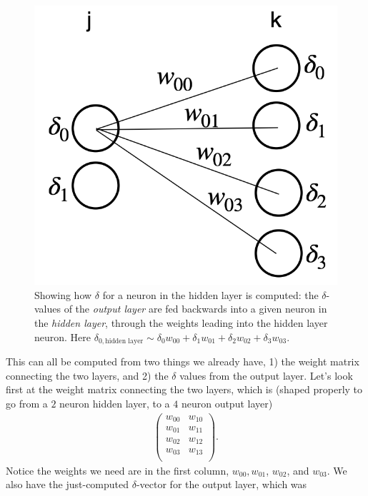 \documentclass[12pt]{article}
\begin{document}
 \begin{figure}[h]
\begin{center}
\includegraphics[scale=0.3]{Figs/nn_delta_connect}
\caption{Showing how $\delta$ for a neuron in the hidden layer is computed: the $\delta$-values of the \emph{output layer} are fed backwards into a given neuron in the \emph{hidden layer}, through the weights leading into the hidden layer neuron.  Here $\delta_{0,\textrm{hidden layer}}\sim \delta_0 w_{00} + \delta_1 w_{01} + \delta_2 w_{02}+ \delta_3 w_{03}.$}
\label{nn_delta_connect}
\end{center}
\end{figure}

This can all be computed from two things we already have, 1) the weight matrix connecting the two layers, and 2) the $\delta$ values from the output layer. Let's look first at the weight matrix connecting the two layers, which is (shaped properly to go from a $2$ neuron hidden layer, to a $4$ neuron output layer)
\begin{align}
 \begin{pmatrix}
           w_{00} &w_{10}  \\
           w_{01} &w_{11}  \\
  	  w_{02} &w_{12} \\
	   w_{03} &w_{13} \\
         \end{pmatrix}.
 \end{align}
 Notice the weights we need are in the first column, $w_{00}, w_{01}$, $w_{02}$, and $w_{03}$.  We also have the just-computed $\delta$-vector for the output layer, which was
 
\end{document}

